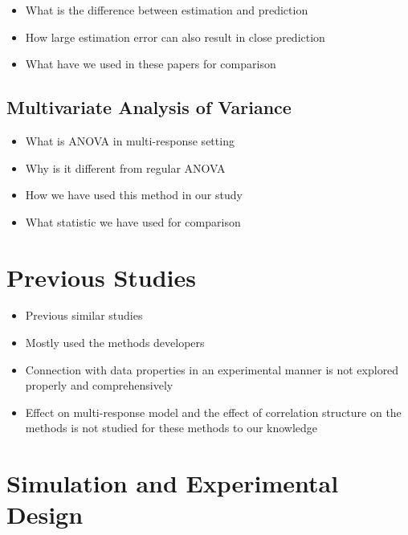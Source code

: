 \documentclass[11pt,twoside,openright,titlepage,
  headinclude,footinclude,BCOR=5mm,
  numbers=noenddot,cleardoublepage=empty,
  tablecaptionabove, dottedtoc,
  bibliography=totoc]{scrreprt}
\providecommand{\tightlist}{%
  \setlength{\itemsep}{0pt}\setlength{\parskip}{0pt}}
\begin{document}
\begin{itemize}
\tightlist
\item
  What is the difference between estimation and prediction
\item
  How large estimation error can also result in close prediction
\item
  What have we used in these papers for comparison
\end{itemize}

\hypertarget{multivariate-analysis-of-variance}{%
\subsection{Multivariate Analysis of Variance}\label{multivariate-analysis-of-variance}}

\begin{itemize}
\tightlist
\item
  What is ANOVA in multi-response setting
\item
  Why is it different from regular ANOVA
\item
  How we have used this method in our study
\item
  What statistic we have used for comparison
\end{itemize}

\hypertarget{previous-studies}{%
\section{Previous Studies}\label{previous-studies}}

\begin{itemize}
\tightlist
\item
  Previous similar studies
\item
  Mostly used the methods developers
\item
  Connection with data properties in an experimental manner is not explored properly and comprehensively
\item
  Effect on multi-response model and the effect of correlation structure on the methods is not studied for these methods to our knowledge
\end{itemize}

\hypertarget{simulation-and-experimental-design}{%
\section{Simulation and Experimental Design}\label{simulation-and-experimental-design}}
\end{document}
